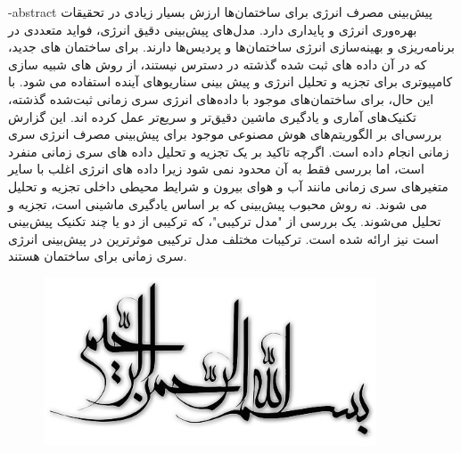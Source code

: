 \department{}

\fa-abstract{
    پیش‌بینی مصرف انرژی برای ساختمان‌ها ارزش بسیار زیادی در تحقیقات بهره‌وری انرژی و پایداری دارد. مدل‌های پیش‌بینی دقیق انرژی، فواید متعددی در برنامه‌ریزی
     و بهینه‌سازی انرژی ساختمان‌ها و پردیس‌ها دارند. برای ساختمان های جدید، 
    که در آن داده های ثبت شده گذشته در دسترس نیستند، از روش های شبیه سازی کامپیوتری برای تجزیه و تحلیل انرژی و پیش بینی سناریوهای آینده استفاده می شود. 
    با این حال، برای ساختمان‌های موجود با داده‌های انرژی سری زمانی ثبت‌شده گذشته، تکنیک‌های آماری و یادگیری ماشین دقیق‌تر و سریع‌تر عمل کرده اند. 
    این گزارش بررسی‌ای بر الگوریتم‌های هوش مصنوعی موجود برای پیش‌بینی مصرف انرژی سری زمانی انجام داده است.
     اگرچه تاکید بر یک تجزیه و تحلیل داده های سری زمانی منفرد است، اما بررسی فقط به آن محدود نمی شود زیرا داده های انرژی 
     اغلب با سایر متغیرهای سری زمانی مانند آب و هوای بیرون و شرایط محیطی داخلی تجزیه و تحلیل می شوند. 
     نه روش محبوب پیش‌بینی که بر اساس یادگیری ماشینی است، تجزیه و تحلیل می‌شوند. یک بررسی از "مدل ترکیبی"، که ترکیبی از دو یا چند تکنیک پیش‌بینی است نیز ارائه شده است.
      ترکیبات مختلف مدل ترکیبی موثرترین در پیش‌بینی انرژی سری زمانی برای ساختمان هستند.
}




\AUTtitle
\vspace*{7cm}
\thispagestyle{empty}
\begin{center}
\includegraphics[height=5cm,width=12cm]{besm}
\end{center}